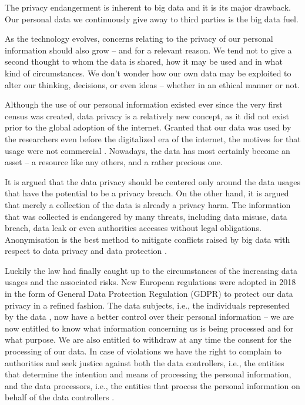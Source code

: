 \documentclass[a4paper,twoside,12pt]{book}
\begin{document}
The privacy endangerment is inherent to big data and it is its major drawback. Our personal data we continuously give away to third parties is the big data fuel.

As the technology evolves, concerns relating to the privacy of our personal information should also grow – and for a relevant reason.  We tend not to give a second thought to whom the data is shared, how it may be used and in what kind of circumstances. We don't wonder how our own data may be exploited to alter our thinking, decisions, or even ideas – whether in an ethical manner or not. 

Although the use of our personal information existed ever since the very first census was created, data privacy is a relatively new concept, as it did not exist prior to the global adoption of the internet. Granted that our data was used by the researchers even before the digitalized era of the internet, the motives for that usage were not commercial \cite{bib:gdpr_handbook}. Nowadays, the data has most certainly become an asset – a resource like any others, and a rather precious one.

It is argued that the data privacy should be centered only around the data usages that have the potential to be a privacy breach. On the other hand, it is argued that merely a collection of the data is already a privacy harm. The information that was collected is endangered by many threats, including data misuse, data breach, data leak or even authorities accesses without legal obligations. Anonymisation is the best method to mitigate conflicts raised by big data with respect to data privacy and data protection \cite{bib:big_data_privacy}.

Luckily the law had finally caught up to the circumstances of the increasing data usages and the associated risks. New European regulations were adopted in 2018 in the form of General Data Protection Regulation (GDPR) to protect our data privacy in a refined fashion. The data subjects, i.e., the individuals represented by the data \cite{bib:anonymization_pipeline}, now have a better control over their personal information – we are now entitled to know what information concerning us is being  processed and for what purpose. We are also entitled to withdraw at any time the consent for the processing of our data. In case of violations we have the right to complain to authorities and seek justice against both the data controllers, i.e., the entities that determine the intention and means of processing the personal information, and the data processors, i.e., the entities that process the personal information on behalf of the data controllers \cite{bib:gdpr_compliance}.
\end{document}

